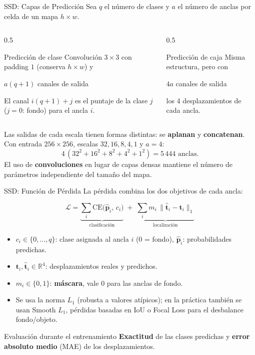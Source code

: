 \documentclass[aspectratio=169, 10pt]{beamer}
\providecommand{\R}{\mathbb{R}}
\newcommand{\formula}[1]{%
	\begin{tcolorbox}[colback=UCMBlue!8, colframe=UCMBlue, arc=4pt,
		boxsep=2pt, left=6pt, right=6pt, top=3pt, bottom=3pt]
		#1
	\end{tcolorbox}
}
\begin{document}
\begin{frame}{SSD: Capas de Predicción}
	Sea $q$ el número de clases y $a$ el número de anclas por celda de un mapa $h\times w$.
	\begin{columns}[T]
		\begin{column}{0.5\textwidth}
			\begin{block}{Predicción de clase}
				Convolución $3\times3$ con padding $1$ (conserva $h\times w$) y
				\begin{center}\textcolor{UCMBlue}{\boldmath$a(q+1)$} canales de salida\end{center}
				El canal $i(q+1)+j$ es el puntaje de la clase $j$ ($j=0$: fondo) para el ancla $i$.
			\end{block}
		\end{column}
		\begin{column}{0.5\textwidth}
			\begin{block}{Predicción de caja}
				Misma estructura, pero con
				\begin{center}\textcolor{UCMBlue}{\boldmath$4a$} canales de salida\end{center}
				los 4 desplazamientos de cada ancla.
			\end{block}
		\end{column}
	\end{columns}
	\vspace{0.2cm}
	Las salidas de cada escala tienen formas distintas: se \textbf{aplanan} y \textbf{concatenan}. Con entrada $256\times256$, escalas $32,16,8,4,1$ y $a=4$:
	\[
	4\,(32^2+16^2+8^2+4^2+1^2) = 5\,444 \text{ anclas}.
	\]
	\small El uso de \textbf{convoluciones} en lugar de capas densas mantiene el número de parámetros independiente del tamaño del mapa.
\end{frame}

\begin{frame}{SSD: Función de Pérdida}
	La pérdida combina los dos objetivos de cada ancla:
	\formula{\[
		\mathcal{L} = \underbrace{\sum_{i} \text{CE}\big(\hat{\bm{p}}_i,\, c_i\big)}_{\text{clasificación}}
		\;+\; \underbrace{\sum_{i} m_i \,\big\| \hat{\bm{t}}_i - \bm{t}_i \big\|_1}_{\text{localización}}
		\]}
	\begin{itemize}
		\item $c_i \in \{0,\ldots,q\}$: clase asignada al ancla $i$ (0 = fondo), $\hat{\bm{p}}_i$: probabilidades predichas.
		\item $\bm{t}_i, \hat{\bm{t}}_i \in \R^4$: desplazamientos reales y predichos.
		\item $m_i \in \{0,1\}$: \textbf{máscara}, vale 0 para las anclas de fondo.
		\item Se usa la norma $L_1$ (robusta a valores atípicos); en la práctica también se usan Smooth $L_1$, pérdidas basadas en IoU o Focal Loss para el desbalance fondo/objeto.
	\end{itemize}
	\begin{block}{Evaluación durante el entrenamiento}
		\textbf{Exactitud} de las clases predichas y \textbf{error absoluto medio} (MAE) de los desplazamientos.
	\end{block}
\end{frame}
\end{document}
